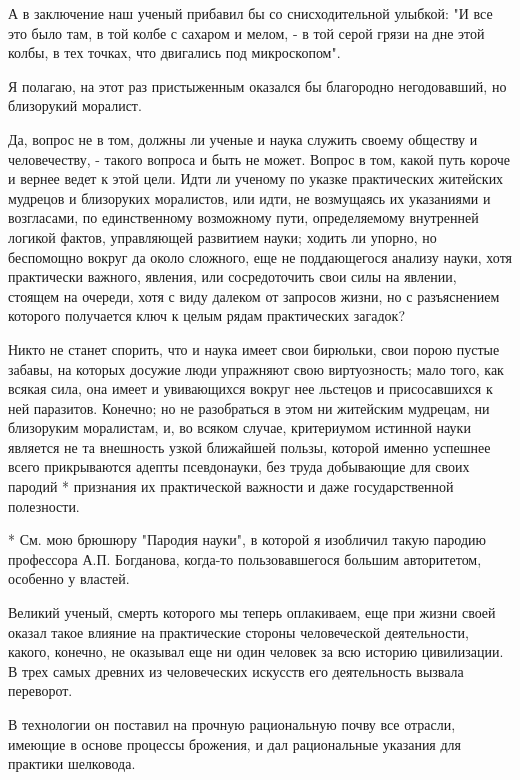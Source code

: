 А в заключение наш ученый прибавил бы со снисходительной улыбкой: "И все
это было там, в той колбе с сахаром и мелом, - в той серой грязи на  дне
этой колбы, в тех точках, что двигались под микроскопом".

Я полагаю, на этот раз пристыженным оказался бы благородно негодовавший,
но близорукий моралист.

Да, вопрос не в том, должны ли ученые и наука служить своему обществу  и
человечеству, - такого вопроса и быть не может. Вопрос в том, какой путь
короче  и  вернее  ведет  к  этой  цели.  Идти  ли  ученому  по   указке
практических житейских мудрецов  и близоруких моралистов,  или идти,  не
возмущаясь их указаниями и возгласами, по единственному возможному пути,
определяемому внутренней  логикой фактов,  управляющей развитием  науки;
ходить ли  упорно,  но  беспомощно  вокруг да  около  сложного,  еще  не
поддающегося анализу  науки,  хотя  практически  важного,  явления,  или
сосредоточить свои  силы на  явлении, стоящем  на очереди,  хотя с  виду
далеком от запросов жизни, но с разъяснением которого получается ключ  к
целым рядам практических загадок?

Никто не станет  спорить, что и  наука имеет свои  бирюльки, свои  порою
пустые забавы, на которых досужие люди упражняют свою виртуозность; мало
того, как всякая  сила, она имеет  и увивающихся вокруг  нее льстецов  и
присосавшихся к  ней паразитов.  Конечно; но  не разобраться  в этом  ни
житейским мудрецам,  ни  близоруким  моралистам, и,  во  всяком  случае,
критериумом истинной  науки является  не  та внешность  узкой  ближайшей
пользы, которой именно успешнее  всего прикрываются адепты  псевдонауки,
без труда  добывающие  для своих  пародий  * признания  их  практической
важности и даже государственной полезности.

* См. мою брюшюру "Пародия науки", в которой я изобличил такую пародию
профессора А.П. Богданова, когда-то пользовавшегося большим
авторитетом, особенно у властей.

Великий ученый,  смерть которого  мы теперь  оплакиваем, еще  при  жизни
своей  оказал  такое  влияние   на  практические  стороны   человеческой
деятельности, какого, конечно, не  оказывал еще ни  один человек за  всю
историю цивилизации. В трех самых  древних из человеческих искусств  его
деятельность вызвала переворот.

В технологии  он поставил  на прочную  рациональную почву  все  отрасли,
имеющие в  основе процессы  брожения, и  дал рациональные  указания  для
практики шелковода.

